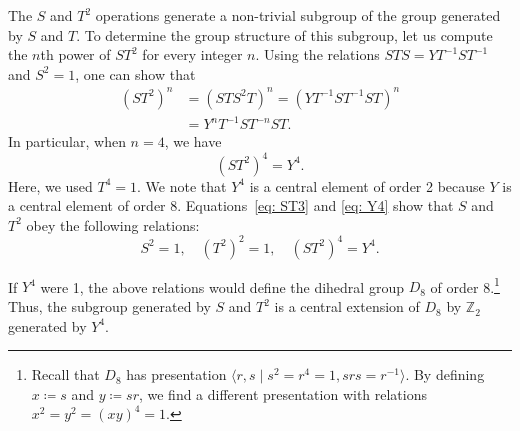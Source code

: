 \documentclass[aps,twocolumn,prx,floatfix,preprintnumbers, nofootinbib,10pt]{revtex4-2}
\numberwithin{equation}{section}
\theoremstyle{definition}
\theoremstyle{remark}
\theoremstyle{claim}
\begin{document}
\vspace*{\baselineskip}
The $S$ and $T^2$ operations generate a non-trivial subgroup of the group generated by $S$ and $T$.
To determine the group structure of this subgroup, let us compute the $n$th power of $ST^2$ for every integer $n$.
Using the relations $STS = YT^{-1}ST^{-1}$ and $S^2=1$, one can show that
\begin{equation}
\begin{aligned}
(ST^2)^n &= (STS^2T)^n = (YT^{-1}ST^{-1}ST)^n \\
&= Y^nT^{-1}ST^{-n}ST.
\end{aligned}
\end{equation}
In particular, when $n=4$, we have
\begin{equation}
(ST^2)^4=Y^4.
\label{eq: Y4}
\end{equation}
Here, we used $T^4=1$.
We note that $Y^4$ is a central element of order 2 because $Y$ is a central element of order 8.
Equations~\eqref{eq: ST3} and \eqref{eq: Y4} show that $S$ and $T^2$ obey the following relations:
\begin{equation}
S^2=1, \quad
(T^2)^2=1, \quad
(ST^2)^4 = Y^4.
\label{eq: ST2 4 continuum}
\end{equation}


If $Y^4$ were 1, the above relations would define the dihedral group $D_8$ of order 8.\footnote{Recall that $D_8$ has presentation $\langle r, s \mid s^2=r^4=1, srs=r^{-1} \rangle$. By defining $x \coloneq s$ and $y \coloneq sr$, we find a different presentation with relations $x^2=y^2=(xy)^4=1$.}
Thus,  the subgroup generated by $S$ and $T^2$ is a central extension of $D_8$ by $\mathbb{Z}_2$ generated by $Y^4$.
\end{document}
